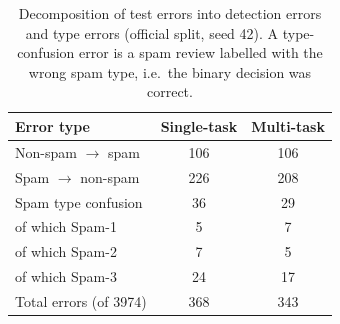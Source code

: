 \begin{table}[t]
\caption{Decomposition of test errors into detection errors and type errors (official split, seed 42). A type-confusion error is a spam review labelled with the wrong spam type, i.e.\ the binary decision was correct.}
\label{tab:gate}
\centering
\small
\begin{tabular}{@{}lcc@{}}
\toprule
Error type & Single-task & Multi-task \\
\midrule
Non-spam $\rightarrow$ spam & 106 & 106 \\
Spam $\rightarrow$ non-spam & 226 & 208 \\
Spam type confusion & 36 & 29 \\
\quad of which Spam-1 & 5 & 7 \\
\quad of which Spam-2 & 7 & 5 \\
\quad of which Spam-3 & 24 & 17 \\
\midrule
Total errors (of 3974) & 368 & 343 \\

\bottomrule
\end{tabular}
\end{table}
